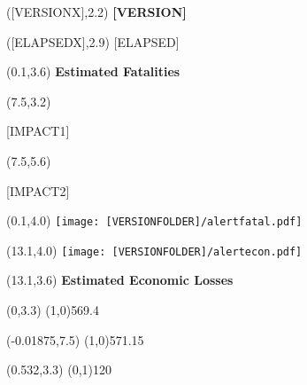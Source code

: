 \documentclass[6pt]{article}
\begin{document}
\begin{textblock}{8}([VERSIONX],2.2)
\fontsize{15}{18}\textbf{[VERSION]}
\end{textblock}

\begin{textblock}{12}([ELAPSEDX],2.9)
[ELAPSED]
\end{textblock}

\begin{textblock}{8}(0.1,3.6)
\fontsize{14}{16.8}\textbf{Estimated Fatalities}
\end{textblock}

\begin{textblock}{5.5}(7.5,3.2)
\begin{spacing}{0.8}
\begin{flushleft}
{\small [IMPACT1]}
\end{flushleft}
\end{spacing}
\end{textblock}

\begin{textblock}{6.1}(7.5,5.6)
\begin{spacing}{0.8}
\begin{flushleft}
{\small [IMPACT2]}
\end{flushleft}
\end{spacing}
\end{textblock}

\begin{textblock}{13.75}(0.1,4.0)
\texttt{[image: [VERSIONFOLDER]/alertfatal.pdf]}
\end{textblock}

\begin{textblock}{13.75}(13.1,4.0)
\texttt{[image: [VERSIONFOLDER]/alertecon.pdf]}
\end{textblock}

\begin{textblock}{8}(13.1,3.6)
\fontsize{14}{16.8}\textbf{Estimated Economic Losses}
\end{textblock}

\linethickness{2pt}
\begin{textblock}{21}(0,3.3)
\line(1,0){569.4}
\end{textblock}

\begin{textblock}{21}(-0.01875,7.5)
\line(1,0){571.15}
\end{textblock}

\begin{textblock}{1}(0.532,3.3)
\line(0,1){120}
\end{textblock}
\end{document}
